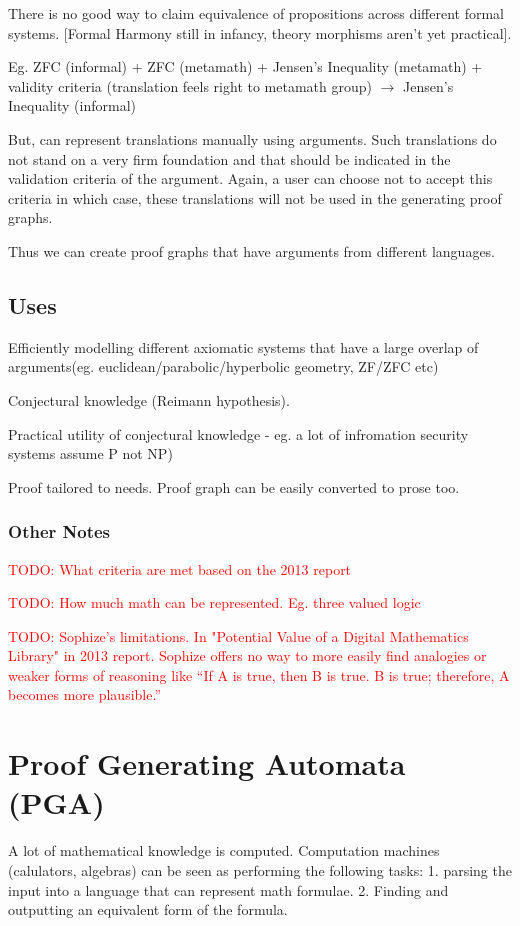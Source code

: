 \documentclass[a4paper]{article}
\newcommand\todo[1]{\textcolor{red}{TODO: #1}}
\begin{document}
There is no good way to claim equivalence of propositions across different formal systems. [Formal Harmony still in infancy, theory morphisms aren't yet practical].


Eg. ZFC (informal) + ZFC (metamath) + Jensen's Inequality (metamath) + validity criteria (translation feels right to metamath group) $\rightarrow$ 
Jensen's Inequality (informal)

But, can represent translations manually using arguments. Such translations do not stand on a very firm foundation and that should be indicated in the validation criteria of the argument. Again, a user can choose not to accept this criteria in which case, these translations will not be used in the generating proof graphs.


Thus we can create proof graphs that have arguments from different languages.

\subsection{Uses}
Efficiently modelling different axiomatic systems that have a large overlap of arguments(eg. euclidean/parabolic/hyperbolic geometry, ZF/ZFC etc)

Conjectural knowledge (Reimann hypothesis). 

Practical utility of conjectural knowledge - eg. a lot of infromation security systems assume  P not NP)

Proof tailored to needs. Proof graph can be easily converted to prose too.


\subsubsection{Other Notes}
\todo{What criteria are met based on the 2013 report}

\todo{How much math can be represented. Eg. three valued logic}

\todo{Sophize's limitations. In "Potential Value of a
Digital Mathematics Library" in 2013 report. Sophize offers no way to more easily find analogies or weaker forms of reasoning like “If A is true, then B is true. B is true; therefore, A becomes more plausible.” }


\section{Proof Generating Automata (PGA)}
A lot of mathematical knowledge is computed. Computation machines (calulators, algebras) can be seen as performing the following tasks: 
1. parsing the input into a language that can represent math formulae. 
2. Finding and outputting an equivalent form of the formula.
\end{document}
